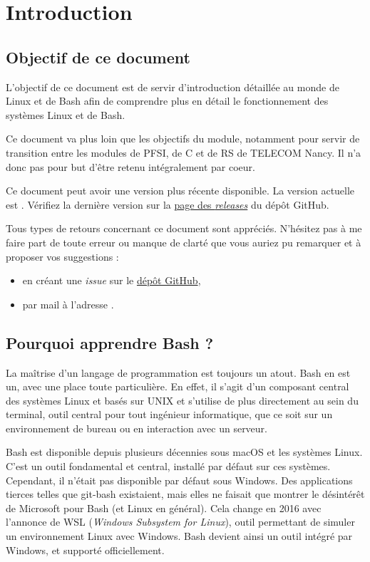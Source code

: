 \section*{Introduction}

\subsection*{Objectif de ce document}
L'objectif de ce document est de servir d'introduction détaillée au monde de Linux et de Bash afin de comprendre plus en détail le fonctionnement des systèmes Linux et de Bash.

Ce document va plus loin que les objectifs du module, notamment pour servir de transition entre les modules de PFSI, de C et de RS de TELECOM Nancy. Il n'a donc pas pour but d'être retenu intégralement par coeur.

 Ce document peut avoir une version plus récente disponible. La version actuelle est \textbf{\Version}. Vérifiez la dernière version sur la  \href{https://github.com/bsegault/linux-shell/releases}{page des \textit{releases}} du dépôt GitHub.

 Tous types de retours concernant ce document sont appréciés. N'hésitez pas à me faire part de toute erreur ou manque de clarté que vous auriez pu remarquer et à proposer vos suggestions :
\begin{itemize}
    \item en créant une \textit{issue} sur le \href{https://github.com/bsegault/linux-shell}{dépôt GitHub},
    \item par mail à l'adresse .
\end{itemize}


\subsection*{Pourquoi apprendre Bash ?}

La maîtrise d'un langage de programmation est toujours un atout. Bash en est un, avec une place toute particulière. En effet, il s'agit d'un composant central des systèmes Linux et basés sur UNIX et s'utilise de plus directement au sein du terminal, outil central pour tout ingénieur informatique, que ce soit sur un environnement de bureau ou en interaction avec un serveur.

Bash est disponible depuis plusieurs décennies sous macOS et les systèmes Linux. C'est un outil fondamental et central, installé par défaut sur ces systèmes. Cependant, il n'était pas disponible par défaut sous Windows. Des applications tierces telles que git-bash existaient, mais elles ne faisait que montrer le désintérêt de Microsoft pour Bash (et Linux en général). Cela change en 2016 avec l'annonce de WSL (\textit{Windows Subsystem for Linux}), outil permettant de simuler un environnement Linux avec Windows. Bash devient ainsi un outil intégré par Windows, et supporté officiellement.


